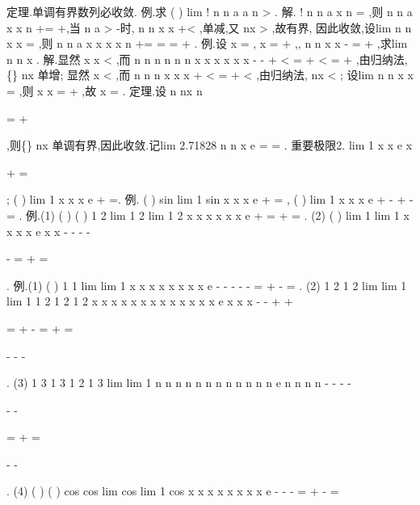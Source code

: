 \textcolor{lyred}{定理}.单调有界数列必收敛. 
\textcolor{lyred}{例}.求
(
)
lim
!
n
n
a
a
n
\to \infty 
>
. 
解.
!
n
n
a
x
n
=
,则
n
n
a
x
x
n
+=
\cdots 
+,当
n
a
>
-时,
n
n
x
x
+<
,单减,又
nx >
,故有界, 
因此收敛,设lim
n
n
x
x
\to \infty 
=
,则
n
n
a
x
x
x
x
n
+=
\cdots 
\Rightarrow 
=
\cdots 
=
+
. 
\textcolor{lyred}{例}.设
x =
,
x =
+
,\Lambda ,
n
n
x
x -
=
+
,求lim
n
n
x
\to \infty 
. 
解.显然
x
x
<
,而
n
n
n
n
n
n
x
x
x
x
x
x
-
-
+
<
\Rightarrow 
=
+
<
=
+
,由归纳法,\{\}
nx
单增; 
显然
x <
,而
n
n
n
x
x
x
+
<
\Rightarrow 
=
+
<
,由归纳法,
nx <
; 
设lim
n
n
x
x
\to \infty 
=
,则
x
x
=
+
,故
x =
. 
\textcolor{lyred}{定理}.设
n
nx
n


=
+




,则\{\}
nx
单调有界,因此收敛.记lim
2.71828
n
n
x
e
\to \infty 
=
=
\Lambda . 
\textcolor{lyred}{重要极限2}.
lim 1
x
x
e
x
\to \infty 


+
=




;
(
)
lim 1
x
x
x
e
\to 
+
=. 
\textcolor{lyred}{例}.
(
)
sin
lim 1 sin
x
x
x
e
\to 
+
=
,
(
)
lim 1
x
x
x
e
+
-
\to 
+
-
=
. 
\textcolor{lyred}{例}.(1)
(
)
(
)
1 2
lim 1 2
lim 1 2
x
x
x
x
x
x
e
\cdots 
\to 
\to 
+
=
+
=
. 
(2)
(
)
lim 1
lim 1
x
x
x
x
e
x
x
\cdots -
-
-
\to \infty 
\to \infty 
-




-
=
+
=








. 
\textcolor{lyred}{例}.(1)
(
)
1 1
lim
lim 1
x
x
x
x
x
x
x
x
e
-
\cdots 
-
-
-
-
\to 
\to 
=
+
-
=
. 
(2)
1 2
1 2
lim
lim 1
lim 1
1 2
1 2
1 2
x
x
x
x
x
x x
x
x
x
x
x
x
e
x
x
x
-
\cdots 
\cdots 
-
\to 
\to 
\to 
+
+






=
+
-
=
+
=






-
-
-






. 
(3)
1 3
1 3
1 2
1 3
lim
lim 1
n
n
n
n
n
n
n
n
n
n
n
n
e
n
n
n
n
-
-
\cdots 
\cdots 
-
-
\to \infty 
\to \infty 


-
-


=
+
=




-
-




. 
(4)
(
)
(
)
cos
cos
lim cos
lim 1
cos
x
x
x
x
x
x
x
x
e
-
-
\cdots 
-
\to 
\to 
=
+
-
=




